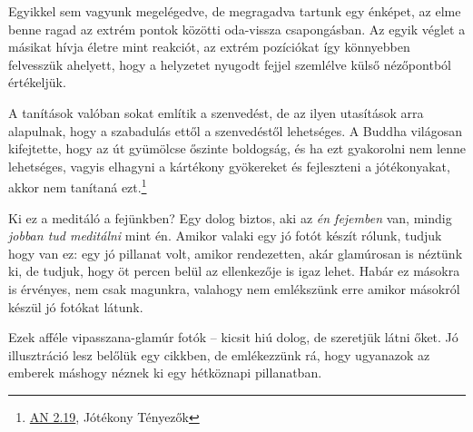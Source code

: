 Egyikkel sem vagyunk megelégedve, de megragadva tartunk egy énképet, az
elme benne ragad az extrém pontok közötti oda-vissza csapongásban. Az
egyik véglet a másikat hívja életre mint reakciót, az extrém pozíciókat
így könnyebben felvesszük ahelyett, hogy a helyzetet nyugodt fejjel
szemlélve külső nézőpontból értékeljük.

A tanítások valóban sokat említik a szenvedést, de az ilyen utasítások
arra alapulnak, hogy a szabadulás ettől a szenvedéstől lehetséges. A
Buddha világosan kifejtette, hogy az út gyümölcse őszinte boldogság, és
ha ezt gyakorolni nem lenne lehetséges, vagyis elhagyni a kártékony
gyökereket és fejleszteni a jótékonyakat, akkor nem tanítaná
ezt.\footnote{\href{https://suttacentral.net/an2.11-20/en/thanissaro}{AN
  2.19}, Jótékony Tényezők}

Ki ez a meditáló a fejünkben? Egy dolog biztos, aki az \emph{én
fejemben} van, mindig \emph{jobban tud meditálni} mint én. Amikor valaki
egy jó fotót készít rólunk, tudjuk hogy van ez: egy jó pillanat volt,
amikor rendezetten, akár glamúrosan is néztünk ki, de tudjuk, hogy öt
percen belül az ellenkezője is igaz lehet. Habár ez másokra is érvényes,
nem csak magunkra, valahogy nem emlékszünk erre amikor másokról készül
jó fotókat látunk.

Ezek afféle vipasszana-glamúr fotók -- kicsit hiú dolog, de szeretjük
látni őket. Jó illusztráció lesz belőlük egy cikkben, de emlékezzünk rá,
hogy ugyanazok az emberek máshogy néznek ki egy hétköznapi pillanatban.

\clearpage
\figurepagelayout
\null\vfill

\vspace*{-4\baselineskip}

